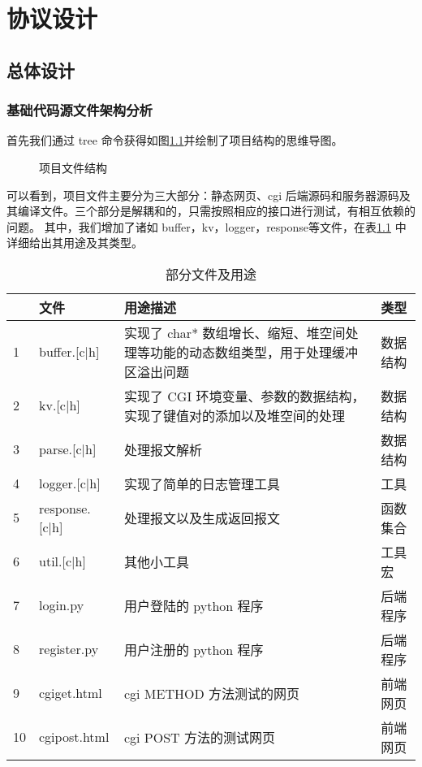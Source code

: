 

\chapter{协议设计}

\section{总体设计}

\subsection{基础代码源文件架构分析}
首先我们通过 tree 命令获得如图\ref{fig:structure}并绘制了项目结构的思维导图。

\begin{figure}[htbp!]
  \centering
  \caption{项目文件结构}\label{fig:structure}
\end{figure}

可以看到，项目文件主要分为三大部分：静态网页、cgi 后端源码和服务器源码及其编译文件。三个部分是解耦和的，只需按照相应的接口进行测试，有相互依赖的问题。
其中，我们增加了诸如 buffer，kv，logger，response等文件，在表\ref{tab:structure} 中详细给出其用途及其类型。

\begin{table}[htbp!]
  \centering
  \begin{tabular}{p{5pt}p{65pt}p{220pt}p{60pt}}
  \hline
    & 文件                 & 用途描述         & 类型 \\ \hline
  1 & buffer.{[}c|h{]}   & 实现了 char* 数组增长、缩短、堆空间处理等功能的动态数组类型，用于处理缓冲区溢出问题 & 数据结构 \\
  2 & kv.{[}c|h{]}       & 实现了 CGI 环境变量、参数的数据结构，实现了键值对的添加以及堆空间的处理        & 数据结构\\
  3 & parse.{[}c|h{]}    & 处理报文解析   & 数据结构 \\
  4 & logger.{[}c|h{]}   & 实现了简单的日志管理工具 & 工具\\
  5 & response.{[}c|h{]} & 处理报文以及生成返回报文 & 函数集合 \\
  6 & util.{[}c|h{]}     & 其他小工具  & 工具宏 \\
  7 & login.py          & 用户登陆的 python 程序 & 后端程序\\
  8 & register.py       & 用户注册的 python 程序 & 后端程序\\
  9 & cgiget.html       & cgi METHOD 方法测试的网页 & 前端网页\\
  10 & cgipost.html     & cgi POST 方法的测试网页 & 前端网页\\
  \hline
  \end{tabular}
  \caption{部分文件及用途}\label{tab:structure}
  \end{table}

